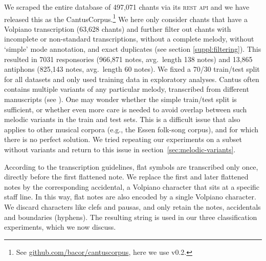 \documentclass{article}
\begin{document}
We scraped the entire database of 497,071 chants via its \textsc{rest api} and we have released this as the CantusCorpus.\footnote{%
    See \href{https://github.com/bacor/cantuscorpus}{github.com/bacor/cantuscorpus}, here we use v0.2.
    }
We here only consider chants that have a Volpiano transcription (63,628 chants) and 
further filter out chants with incomplete or non-standard transcriptions, without a complete melody, without `simple' mode annotation, and exact duplicates (see section \ref{suppl:filtering}).
This resulted in 7031 responsories (966,871 notes, avg.~length 138 notes) and 13,865 antiphons (825,143 notes, avg.~length 60 notes).
We fixed a 70/30 train/test split for all datasets and only used training data in exploratory analyses.
Cantus often contains multiple variants of any particular melody, transcribed from different manuscripts (see ). 
One may wonder whether the simple train/test split is sufficient, or whether even more care is needed to avoid overlap between such melodic variants in the train and test sets.
This is a difficult issue that also applies to other musical corpora (e.g., the Essen folk-song corpus), and for which there is no perfect solution.
We tried repeating our experiments on a subset without variants and return to this issue in section~\ref{sec:melodic-variants}.


According to the transcription guidelines, flat symbols are transcribed only once, directly before the first flattened note.
We replace the first and later flattened notes by the corresponding accidental, a Volpiano character that sits at a specific staff line. 
In this way, flat notes are also encoded by a single Volpiano character.
We discard characters like clefs and pausas, and only retain the notes, accidentals and boundaries (hyphens).
The resulting string is used in our three classification experiments, which we now discuss.
\end{document}
